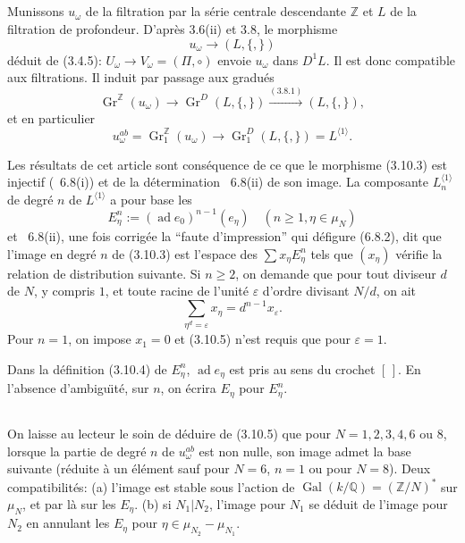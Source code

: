 \documentclass[11pt,a4paper]{article}
\theoremstyle{plain}
\theoremstyle{definition}
\DeclareMathOperator{\Gal}{Gal}
\DeclareMathOperator{\ad}{ad}
\newcommand{\Q}{\mathbb{Q}}
\newcommand{\Z}{\mathbb{Z}}
\newcommand{\Gr}{\operatorname{Gr}}
\begin{document}
\subsection{}
Munissons $u_\omega$ de la filtration par la s\'erie centrale descendante $\Z$ et $L$ de la filtration de profondeur. D'apr\`es 3.6(ii) et 3.8, le morphisme
\begin{equation}\label{eq:3.10.1}
u_\omega \to (L, \{,\})
\end{equation}
d\'eduit de (3.4.5): $U_\omega \to V_\omega = (\Pi, \circ)$ envoie $u_\omega$ dans $D^1L$. Il est donc compatible aux filtrations. Il induit par passage aux gradu\'es
\begin{equation}\label{eq:3.10.2}
\Gr^\Z(u_\omega) \to \Gr^D(L, \{,\}) \xrightarrow{(3.8.1)} (L, \{,\}),
\end{equation}
et en particulier
\begin{equation}\label{eq:3.10.3}
u_\omega^{ab} = \Gr_1^\Z(u_\omega) \to \Gr_1^D(L, \{,\}) = L^{\langle 1 \rangle}.
\end{equation}

Les r\'esultats de cet article sont cons\'equence de ce que le morphisme (3.10.3) est injectif (\cite{1}~6.8(i)) et de la d\'etermination \cite{1}~6.8(ii) de son image. La composante $L^{\langle 1 \rangle}_n$ de degr\'e $n$ de $L^{\langle 1 \rangle}$ a pour base les
\begin{equation}\label{eq:3.10.4}
E_\eta^n := (\ad e_0)^{n-1}(e_\eta) \quad (n \geq 1, \eta \in \mu_N)
\end{equation}
et \cite{1}~6.8(ii), une fois corrig\'ee la ``faute d'impression'' qui d\'efigure (6.8.2), dit que l'image en degr\'e $n$ de (3.10.3) est l'espace des $\sum x_\eta E_\eta^n$ tels que $(x_\eta)$ v\'erifie la relation de distribution suivante. Si $n \geq 2$, on demande que pour tout diviseur $d$ de $N$, y compris $1$, et toute racine de l'unit\'e $\varepsilon$ d'ordre divisant $N/d$, on ait
\begin{equation}\label{eq:3.10.5}
\sum_{\eta^d = \varepsilon} x_\eta = d^{n-1} x_\varepsilon.
\end{equation}
Pour $n=1$, on impose $x_1 = 0$ et (3.10.5) n'est requis que pour $\varepsilon = 1$.

Dans la d\'efinition (3.10.4) de $E_\eta^n$, $\ad e_\eta$ est pris au sens du crochet $[\,]$. En l'absence d'ambigu\"{\i}t\'e, sur $n$, on \'ecrira $E_\eta$ pour $E_\eta^n$.

\subsection{}
On laisse au lecteur le soin de d\'eduire de (3.10.5) que pour $N=1,2,3,4,6$ ou $8$, lorsque la partie de degr\'e $n$ de $u_\omega^{ab}$ est non nulle, son image admet la base suivante (r\'eduite \`a un \'el\'ement sauf pour $N=6$, $n=1$ ou pour $N=8$). Deux compatibilit\'es: (a) l'image est stable sous l'action de $\Gal(k/\Q) = (\Z/N)^\ast$ sur $\mu_N$, et par l\`a sur les $E_\eta$. (b) si $N_1 | N_2$, l'image pour $N_1$ se d\'eduit de l'image pour $N_2$ en annulant les $E_\eta$ pour $\eta \in \mu_{N_2} - \mu_{N_1}$.
\end{document}
